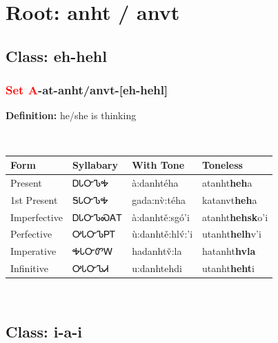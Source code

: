 \needspace{4in}
\section*{Root: anht / anvt}
\nopagebreak
{}
\needspace{3in}
\subsection*{Class: eh-hehl}
\nopagebreak
\needspace{2in}
\subsubsection*{\textcolor{Red}{Set A}{-}at{-}\textbf{anht/anvt}{-}[eh-hehl]}
\nopagebreak
\textbf{Definition: } he/she is thinking
\\[0.5em]
\begin{tabularx}{\textwidth}{l X X X}%
\toprule%
\textbf{Form}&\textbf{Syllabary}&\textbf{With Tone}&\textbf{Toneless}\\%
\midrule%
Present&ᎠᏓᏅᏖᎭ&à:danhtéha&atanht\textbf{heh}a\\%
1st Present&ᎦᏓᏅᏖᎭ&gada:nv̀:téha&katanvt\textbf{heh}a\\%
Imperfective&ᎠᏓᏅᏖᏍᎪᎢ&à:danhtě:sgó’i&atanht\textbf{hehsk}o'i\\%
Perfective&ᎤᏓᏅᏖᏢᎢ&ù:danhtě:hlv́:’i&utanht\textbf{helh}v'i\\%
Imperative&ᎭᏓᏅᏛᎳ&hadanhtv̌:la&hatanht\textbf{hvla}\\%
Infinitive&ᎤᏓᏅᏖᏗ&u:danhtehdi&utanht\textbf{heht}i\\%
\bottomrule%
\end{tabularx}
\\[1em]
\needspace{3in}
\subsection*{Class: i-a-i}
\nopagebreak
\needspace{2in}
